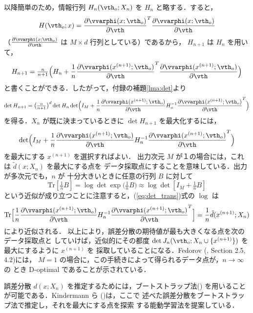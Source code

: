 \documentclass[master]{cimt}
\newcommand{\parder}[2]{\frac{\partial #1}{\partial #2}}
\newcommand{\trace}{\text{Tr}}
\begin{document}
以降簡単のため，情報行列 $H_n(\vth_o; X_n)$ を
$H_n$ と略する．すると，
\begin{equation*}
	H(\vth_o; x) = \parder{\vvarphi(x; \vth_o)}{\vth}^T
	\parder{\vvarphi(x; \vth_o)}{\vth}
\end{equation*}
（$\parder{\vvarphi(x; \vth_o)}{\vth}$ は $M \times d$ 
行列としている）であるから，
$H_{n+1}$ は $H_n$ を用いて，
\begin{equation*}
	H_{n+1} = \tfrac{n}{n+1} \Bigl( 
	H_n + \frac{1}{n}  
	\parder{\vvarphi(x^{(n+1)}; \vth_o)}{\vth}^T
	\parder{\vvarphi(x^{(n+1)}; \vth_o)}{\vth}  \Bigr)
\end{equation*}
と書くことができる．したがって，付録の補題\ref{lma:det}より
\begin{equation*}
	\det H_{n+1} = \bigl( \tfrac{n}{n+1} \bigr)^d 
	\det H_n \det 
	\Bigl( I_M + \frac{1}{n} 
	\parder{\vvarphi(x^{(n+1)}; \vth_o)}{\vth} H_n^{-1}
	\parder{\vvarphi(x^{(n+1)}; \vth_o)}{\vth}^T \Bigr) 
\end{equation*}
を得る．$X_n$ が既に決まっているときに
$\det H_{n+1}$ を最大化するには，
\begin{equation}
\label{eq:det_trans}
	\det 
	\Bigl( I_M + \frac{1}{n} 
	\parder{\vvarphi(x^{(n+1)}; \vth_o)}{\vth} H_n^{-1}
	\parder{\vvarphi(x^{(n+1)}; \vth_o)}{\vth}^T \Bigr) 
\end{equation}
を最大にする $x^{(n+1)}$ を選択すればよい．
出力次元 $M$ が１の場合には，これは $\tilde{d}(x; X_n)$ を最大にする点を
データ採取点にすることを意味している．出力が多次元でも，$n$ が
十分大きいときに任意の行列 $B$ に対して
\[
	\trace[\tfrac{1}{n} B ] = 
	\log \det \exp\bigl( \tfrac{1}{n} B \bigr) 
	 \approx \log \det [ I_M + \tfrac{1}{n} B] 
\]
という近似が成り立つことに注意すると，(\ref{eq:det_trans})式の $\log$ は
\begin{equation*}
\trace\Bigl[ \frac{1}{n} 
	\parder{\vvarphi(x^{(n+1)}; \vth_o)}{\vth} H_n^{-1}
	\parder{\vvarphi(x^{(n+1)}; \vth_o)}{\vth}^T   \Bigr]
	= \frac{1}{n} \tilde{d}(x^{(n+1)}; X_n)
\end{equation*}
により近似される．
以上により，誤差分散の期待値が最も大きくなる点を次のデータ採取点と
していけば，近似的にその都度 $\det J_n(\vth_o; X_n \cup \{x^{(n+1)}\})$ 
を最大にするように $x^{(n+1)}$ を
採取していることになる．Fedorov (\cite{Fedorov}, Section 2.5, 4.2)には，
$M = 1$ の場合に，この手続きによって得られるデータ点が，$n\to \infty$ の
とき D-optimal であることが示されている．

誤差分散 $d(x; X_n)$ を推定するためには，ブートストラップ法(\cite{Bootstrap})
を用いることが可能である．Kindermann ら (\cite{Paass_95})は，ここで
述べた誤差分散をブートストラップ法で推定し，それを最大にする点を探索
する能動学習法を提案している．
\end{document}
